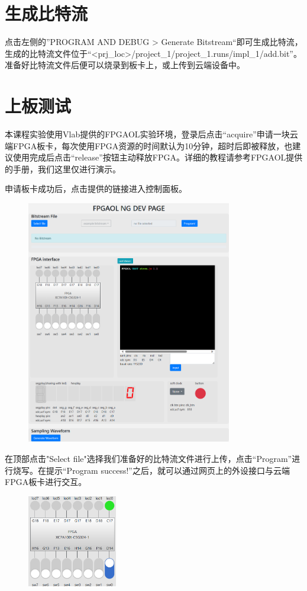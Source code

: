 \documentclass{ctexart}
\begin{document}

\section{生成比特流}

点击左侧的”PROGRAM AND DEBUG > Generate Bitstream“即可生成比特流，生成的比特流文件位于“<prj\_loc>/project\_1/project\_1.runs/impl\_1/add.bit”。准备好比特流文件后便可以烧录到板卡上，或上传到云端设备中。


\section{上板测试}

本课程实验使用Vlab提供的FPGAOL实验环境，登录后点击“acquire”申请一块云端FPGA板卡，每次使用FPGA资源的时间默认为10分钟，超时后即被释放，也建议使用完成后点击“release”按钮主动释放FPGA。详细的教程请参考FPGAOL提供的手册，我们这里仅进行演示。

申请板卡成功后，点击提供的链接进入控制面板。

\begin{figure}[H]
    \centering
    \includegraphics[width=0.8\textwidth]{lab0/35.png}
    \label{fig:35}
\end{figure}

在顶部点击"Select file"选择我们准备好的比特流文件进行上传，点击“Program”进行烧写。在提示“Program success!”之后，就可以通过网页上的外设接口与云端FPGA板卡进行交互。

\begin{figure}[H]
    \centering
    \includegraphics[width=0.35\textwidth]{lab0/36.png}
    \label{fig:36}
\end{figure}
\end{document}
